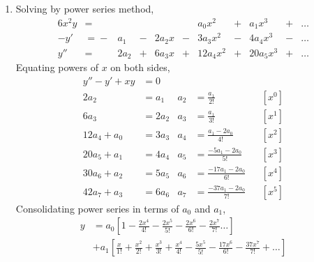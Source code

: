 \begin{enumerate}
    \item Solving by power series method,
          \begin{alignat}{6}
              x^2 y & ={}       &       & {}        &        &
                    & a_0 x^2   & {}+{} & a_1x^3    & {}+{}  & \dots \\
              -y'   & ={}-{}    & a_1   & {}-{}     & 2a_2 x &
              {}-{} & 3a_3 x^2  & {}-{} & 4a_4 x^3  & {}-{}  & \dots \\
              y''   & ={}       & 2a_2  & {}+{}     & 6a_3 x &
              {}+{} & 12a_4 x^2 & {}+{} & 20a_5 x^3 & {}+{}  & \dots
          \end{alignat}
          Equating powers of $ x $ on both sides,
          \begin{align}
              y'' - y' + xy & = 0                                    \\
              2a_2          & = a_1                      &
              a_2           & = \frac{a_1}{2!}           &   & [x^0] \\
              6a_3          & = 2a_2                     &
              a_3           & = \frac{a_1}{3!}           &   & [x^1] \\
              12a_4 + a_0   & = 3a_3                     &
              a_4           & = \frac{a_1 - 2a_0}{4!}    &   & [x^2] \\
              20a_5 + a_1   & = 4a_4                     &
              a_5           & = \frac{-5a_1 - 2a_0}{5!}  &   & [x^3] \\
              30a_6 + a_2   & = 5a_5                     &
              a_6           & = \frac{-17a_1 - 2a_0}{6!} &   & [x^4] \\
              42a_7 + a_3   & = 6a_6                     &
              a_7           & = \frac{-37a_1 - 2a_0}{7!} &   & [x^5]
          \end{align}
          Consolidating power series in terms of $ a_0 $ and $ a_1 $,
          \begin{align}
              y & = a_0\left[ 1 - \frac{2x^4}{4!}
              - \frac{2x^5}{5!} - \frac{2x^6}{6!} - \frac{2x^7}{7!} \dots \right] \\
                & + a_1 \left[ \frac{x}{1!} + \frac{x^2}{2!}
                  + \frac{x^3}{3!} + \frac{x^4}{4!} - \frac{5x^5}{5!}
                  - \frac{17x^6}{6!} - \frac{37x^7}{7!} + \dots \right]
          \end{align}


\end{enumerate}
